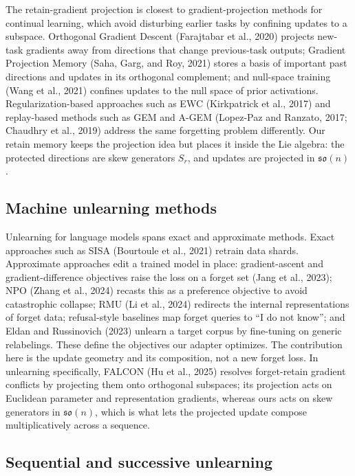 \documentclass[
]{article}
\begin{document}
The retain-gradient projection is closest to gradient-projection methods for continual learning, which avoid disturbing earlier tasks by confining updates to a subspace. Orthogonal Gradient Descent (Farajtabar et al., 2020) projects new-task gradients away from directions that change previous-task outputs; Gradient Projection Memory (Saha, Garg, and Roy, 2021) stores a basis of important past directions and updates in its orthogonal complement; and null-space training (Wang et al., 2021) confines updates to the null space of prior activations. Regularization-based approaches such as EWC (Kirkpatrick et al., 2017) and replay-based methods such as GEM and A-GEM (Lopez-Paz and Ranzato, 2017; Chaudhry et al., 2019) address the same forgetting problem differently. Our retain memory keeps the projection idea but places it inside the Lie algebra: the protected directions are skew generators \(S_r\), and updates are projected in \(\mathfrak{so}(n)\).

\subsection{Machine unlearning methods}\label{machine-unlearning-methods}

Unlearning for language models spans exact and approximate methods. Exact approaches such as SISA (Bourtoule et al., 2021) retrain data shards. Approximate approaches edit a trained model in place: gradient-ascent and gradient-difference objectives raise the loss on a forget set (Jang et al., 2023); NPO (Zhang et al., 2024) recasts this as a preference objective to avoid catastrophic collapse; RMU (Li et al., 2024) redirects the internal representations of forget data; refusal-style baselines map forget queries to ``I do not know''; and Eldan and Russinovich (2023) unlearn a target corpus by fine-tuning on generic relabelings. These define the objectives our adapter optimizes. The contribution here is the update geometry and its composition, not a new forget loss. In unlearning specifically, FALCON (Hu et al., 2025) resolves forget-retain gradient conflicts by projecting them onto orthogonal subspaces; its projection acts on Euclidean parameter and representation gradients, whereas ours acts on skew generators in \(\mathfrak{so}(n)\), which is what lets the projected update compose multiplicatively across a sequence.

\subsection{Sequential and successive unlearning}\label{sequential-and-successive-unlearning}
\end{document}
